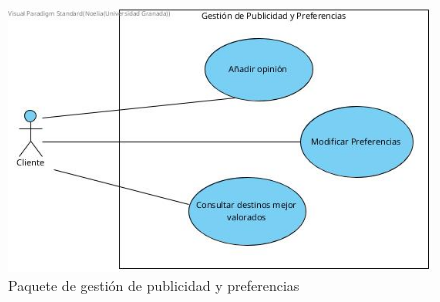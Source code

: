 \documentclass{article}
\begin{document}
	\begin{figure}[H]
		\centering
		\includegraphics[totalheight=5cm]{GestionDePublicidadYPreferencias}
		\caption{Paquete de gestión de publicidad y preferencias}
		\label{fig:gestion_publicidad_preferencias}
	\end{figure}
	
\end{document}
